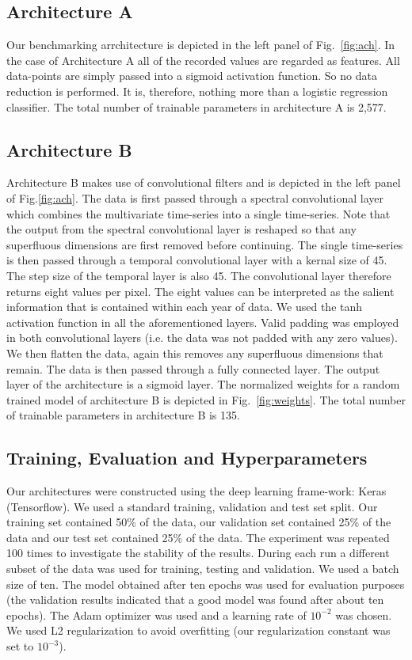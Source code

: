 \documentclass{article}
\begin{document}
\subsection{Architecture A}
Our benchmarking arrchitecture is depicted in the left panel of Fig.~\ref{fig:ach}. In the case of Architecture A all of the recorded values are regarded as features. All data-points are simply passed into a sigmoid activation function. So no data reduction is performed. It is, therefore,  nothing more than a logistic regression classifier.
The total number of trainable parameters in architecture A is 2,577.

\subsection{Architecture B}
Architecture B makes use of convolutional filters and is depicted in the left panel of Fig.\ref{fig:ach}. The data is first passed through a spectral convolutional layer which combines the multivariate time-series into a single time-series. Note that the output from the spectral convolutional layer is reshaped so that any superfluous dimensions are first removed before continuing. The single time-series is then passed through a temporal convolutional layer with a kernal size of 45. The step size of the temporal layer is also 45. The convolutional layer therefore returns eight values per pixel. The eight values can be interpreted as the salient information that is contained within each year of data. We used the tanh activation function in all the aforementioned layers. Valid padding was employed in both convolutional layers (i.e. the data was not padded with any zero values). We then flatten the data, again this removes any superfluous dimensions that remain. The data is then passed through a fully connected layer. The output layer of the architecture is a sigmoid layer. The normalized weights for a random trained model of architecture B is depicted in Fig.~\ref{fig:weights}. The total number of trainable parameters in architecture B is 135.
     

\subsection{Training, Evaluation and Hyperparameters}
\label{sec:hyper}
Our architectures were constructed using the deep learning frame-work: Keras (Tensorflow). We used a standard training, validation and test set split. Our training set contained 50\% of the data, our validation set contained 25\% of the data and our test set contained 25\% of the data. The experiment was repeated 100 times to investigate the stability of the results. During each run a different subset of the data was used for training, testing and validation. We used a batch size of ten. The model obtained after ten epochs was used for evaluation purposes (the validation results indicated that a good model was found after about ten epochs). The Adam optimizer was used and a learning rate of $10^{-2}$ was chosen. We used L2 regularization to avoid overfitting (our regularization constant was set to $10^{-3}$).    
 
\end{document}
